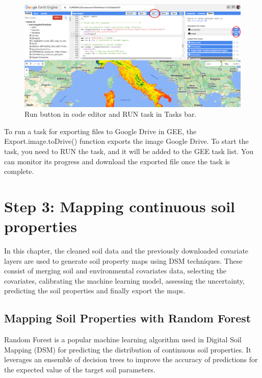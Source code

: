 \documentclass[
  10pt,
  b5paper,
  oneside]{book}
\begin{document}
\begin{figure}
\includegraphics[width=26.26in]{images/GEE_export} \caption{Run button in code editor and RUN task in Tasks bar.}\label{fig:RUN}
\end{figure}

To run a task for exporting files to Google Drive in GEE, the Export.image.toDrive() function exports the image Google Drive. To start the task, you need to RUN the task, and it will be added to the GEE task list. You can monitor its progress and download the exported file once the task is complete.

\hypertarget{step-3-mapping-continuous-soil-properties}{%
\chapter{Step 3: Mapping continuous soil properties}\label{step-3-mapping-continuous-soil-properties}}

In this chapter, the cleaned soil data and the previously downloaded covariate layers are used to generate soil property maps using DSM techniques. These consist of merging soil and environmental covariates data, selecting the covariates, calibrating the machine learning model, assessing the uncertainty, predicting the soil properties and finally export the maps.

\hypertarget{mapping-soil-properties-with-random-forest}{%
\section{Mapping Soil Properties with Random Forest}\label{mapping-soil-properties-with-random-forest}}

Random Forest is a popular machine learning algorithm used in Digital Soil Mapping (DSM) for predicting the distribution of continuous soil properties. It leverages an ensemble of decision trees to improve the accuracy of predictions for the expected value of the target soil parameters.
\end{document}
